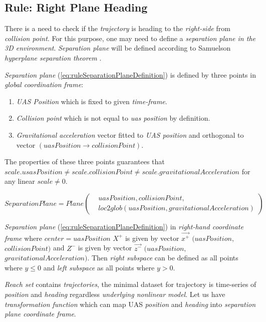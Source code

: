 \subsection{Rule: Right Plane Heading}\label{sec:ruleRightPlaneHeading}
\noindent There is a need to check if the \emph{trajectory} is heading to the \emph{right-side} from \emph{collision point}. For this purpose, one may need to define a \emph{separation plane in the 3D environment}. \emph{Separation plane} will be defined according to Samuelson \emph{hyperplane separation theorem} \cite{samelson1958partition}.

\emph{Separation plane} (\ref{eq:ruleSeparationPlaneDefinition}) is defined by three points in \emph{global coordination frame}:
\begin{enumerate}
    \item \emph{UAS Position} which is fixed to given \emph{time-frame}.
    \item \emph{Collision point} which is not equal to \emph{uas position} by definition.
    \item \emph{Gravitational acceleration} vector fitted to \emph{UAS position} and orthogonal to vector $(uasPosition\to collisionPoint)$.
\end{enumerate}
The properties of these three points guarantees that 
$scale.usasPosition\neq scale.collisionPoint \neq scale.gravitationalAcceleration$ for any linear $scale\neq0$.

\begin{equation}\label{eq:ruleSeparationPlaneDefinition}
    SeparationPlane=Plane\left(\begin{aligned}&uasPosition,collisionPoint,\\&loc2glob(uasPosition,gravitationalAcceleration)\end{aligned}\right)
\end{equation}

\noindent \emph{Separation plane} (\ref{eq:ruleSeparationPlaneDefinition}) in \emph{right-hand coordinate frame} where $center=uasPosition$ $X^+$ is given by vector $\vec{x^+}$ $(uasPosition,$ $collisionPoint)$  and $Z^-$ is given by vector $\vec{z^-}$  $(uasPosition,$ $gravitationalAcceleration)$. Then \emph{right subspace} can be defined as all points where $y\le0$ and \emph{left subspace} as all points where $y>0$.

\emph{Reach set} contains \emph{trajectories}, the minimal dataset for trajectory is time-series of \emph{position} and \emph{heading} regardless \emph{underlying nonlinear model}. Let us have \emph{transformation function} which can map UAS \emph{position} and \emph{heading} into \emph{separation plane coordinate frame}. 

